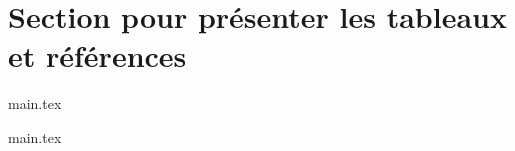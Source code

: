 \section{Section pour présenter les tableaux et références}%
\label{sec:section1-chap2}

{main.tex}

{main.tex}


